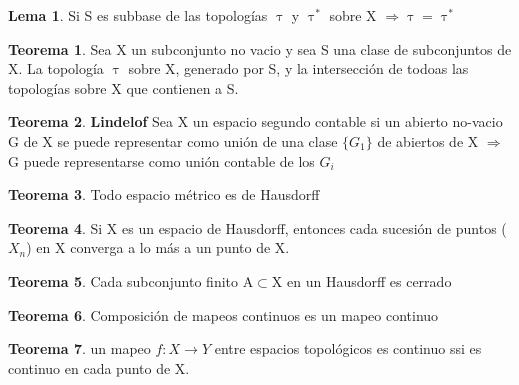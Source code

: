 \documentclass{article}
\theoremstyle{definition}
\newtheorem{theorem}{Teorema}[section]
\newtheorem{lemma}{Lema}[section]
\begin{document}

\begin{lemma}
Si S es subbase de las topologías $\uptau$ y $\uptau^*$  sobre X $\Rightarrow\uptau = \uptau^*$
\end{lemma}


\begin{theorem}
Sea X un subconjunto no vacio y sea S una clase de subconjuntos de X. La topología $\uptau$ sobre X, generado por S, y la intersección de todoas las topologías sobre X que contienen a S. 
\end{theorem}


\begin{theorem}{\textbf{Lindelof}}
	Sea X un espacio segundo contable si un abierto no-vacio G de X se puede representar como unión de una clase $\{G_1\}$ de abiertos de X $\Rightarrow$ G puede representarse como unión contable de los $G_i$
\end{theorem}


\begin{theorem}
	Todo espacio métrico es de Hausdorff 
\end{theorem}


\begin{theorem}
	Si X es un espacio de Hausdorff, entonces cada sucesión de puntos ($X_n$) en X converga a lo más a un punto de X.
\end{theorem}


\begin{theorem}
	Cada subconjunto finito A$\subset$X en un Hausdorff es cerrado
\end{theorem}


\begin{theorem}
	Composición de mapeos continuos es un mapeo continuo
\end{theorem}


\begin{theorem}
	 un mapeo $f:X\to Y$ entre espacios topológicos es continuo ssi es continuo en cada punto de X.
\end{theorem}

\end{document}
